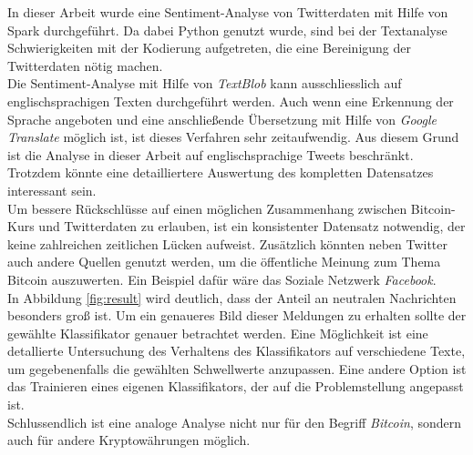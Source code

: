 
In dieser Arbeit wurde eine Sentiment-Analyse von Twitterdaten mit Hilfe von Spark durchgef\"uhrt. Da dabei Python genutzt wurde, sind bei der Textanalyse Schwierigkeiten mit der Kodierung aufgetreten, die eine Bereinigung der Twitterdaten n\"otig machen. \\
Die Sentiment-Analyse mit Hilfe von \textit{TextBlob} kann ausschliesslich auf englischsprachigen Texten durchgef\"uhrt werden. Auch wenn eine Erkennung der Sprache angeboten und eine anschlie{\ss}ende \"Ubersetzung mit Hilfe von \textit{Google Translate} m\"oglich ist, ist dieses Verfahren sehr zeitaufwendig. Aus diesem Grund ist die Analyse in dieser Arbeit auf englischsprachige Tweets beschr\"ankt. Trotzdem k\"onnte eine detailliertere Auswertung des kompletten Datensatzes interessant sein.\\
Um bessere R\"uckschl\"usse auf einen m\"oglichen Zusammenhang zwischen Bitcoin-Kurs und Twitterdaten zu erlauben, ist ein konsistenter Datensatz notwendig, der keine zahlreichen zeitlichen L\"ucken aufweist. Zus\"atzlich k\"onnten neben Twitter auch andere Quellen genutzt werden, um die \"offentliche Meinung zum Thema Bitcoin auszuwerten. Ein Beispiel daf\"ur w\"are das Soziale Netzwerk \textit{Facebook}. \\
In Abbildung \ref{fig:result} wird deutlich, dass der Anteil an neutralen Nachrichten besonders gro{\ss} ist. Um ein genaueres Bild dieser Meldungen zu erhalten sollte der gew\"ahlte Klassifikator genauer betrachtet werden. Eine M\"oglichkeit ist eine detallierte Untersuchung des Verhaltens des Klassifikators auf verschiedene Texte, um gegebenenfalls die gew\"ahlten Schwellwerte anzupassen. Eine andere Option ist das Trainieren eines eigenen Klassifikators, der auf die Problemstellung angepasst ist. \\
Schlussendlich ist eine analoge Analyse nicht nur f\"ur den Begriff \textit{Bitcoin}, sondern auch f\"ur andere Kryptow\"ahrungen m\"oglich.
